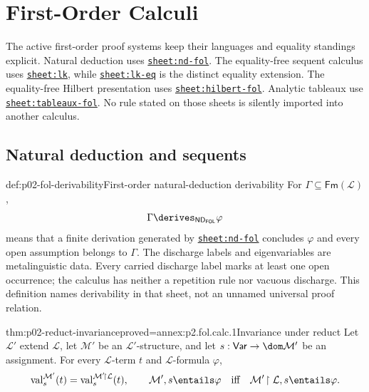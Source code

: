 
\chapter{First-Order Calculi}
\label{sec:p02-first-order-calculi}

The active first-order proof systems keep their languages and equality
standings explicit.  Natural deduction uses
\hyperref[sheet:nd-fol]{\texttt{sheet:nd-fol}}.  The equality-free sequent
calculus uses \hyperref[sheet:lk]{\texttt{sheet:lk}}, while
\hyperref[sheet:lk-eq]{\texttt{sheet:lk-eq}} is the distinct equality
extension.  The equality-free Hilbert presentation uses
\hyperref[sheet:hilbert-fol]{\texttt{sheet:hilbert-fol}}.  Analytic tableaux
use \hyperref[sheet:tableaux-fol]{\texttt{sheet:tableaux-fol}}.  No rule
stated on those sheets is silently imported into another calculus.

\section{Natural deduction and sequents}
\label{sec:p02-fol-nd-lk}

\begin{hbdefinition}{def:p02-fol-derivability}{First-order natural-deduction derivability}
For \(\Gamma\subseteq\mathsf{Fm}(\mathcal L)\),
\[
 \Gamma\derives_{\mathsf{ND}_{\mathsf{FOL}}}\varphi
\]
means that a finite derivation generated by
\hyperref[sheet:nd-fol]{\texttt{sheet:nd-fol}} concludes \(\varphi\) and
every open assumption belongs to \(\Gamma\).  The discharge labels and
eigenvariables are metalinguistic data.  Every carried discharge label marks
at least one open occurrence; the calculus has neither a repetition rule nor
vacuous discharge.  This definition names derivability in that sheet, not an
unnamed universal proof relation.
\end{hbdefinition}

\begin{hblemma}{thm:p02-reduct-invariance}{proved=annex:p2.fol.calc.1}{Invariance under reduct}
Let \(\mathcal L'\) extend \(\mathcal L\), let \(\mathcal M'\) be an
\(\mathcal L'\)-structure, and let \(s:\mathsf{Var}\to
\dom\mathcal M'\) be an assignment.  For every \(\mathcal L\)-term \(t\)
and \(\mathcal L\)-formula \(\varphi\),
\[
 \operatorname{val}^{\mathcal M'}_s(t)
 =\operatorname{val}^{\mathcal M'\!\upharpoonright\mathcal L}_s(t),
 \qquad
 \mathcal M',s\entails\varphi
 \quad\text{iff}\quad
 \mathcal M'\!\upharpoonright\mathcal L,s\entails\varphi.
\]
\end{hblemma}


